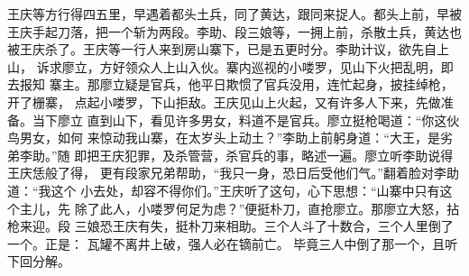 王庆等方行得四五里，早遇着都头土兵，同了黄达，跟同来捉人。都头上前，早被
王庆手起刀落，把一个斩为两段。李助、段三娘等，一拥上前，杀散土兵，黄达也
被王庆杀了。王庆等一行人来到房山寨下，已是五更时分。李助计议，欲先自上山，
诉求廖立，方好领众人上山入伙。寨内巡视的小喽罗，见山下火把乱明，即去报知
寨主。那廖立疑是官兵，他平日欺惯了官兵没用，连忙起身，披挂绰枪，开了栅寨，
点起小喽罗，下山拒敌。王庆见山上火起，又有许多人下来，先做准备。当下廖立
直到山下，看见许多男女，料道不是官兵。廖立挺枪喝道：“你这伙鸟男女，如何
来惊动我山寨，在太岁头上动土？”李助上前躬身道：“大王，是劣弟李助。”随
即把王庆犯罪，及杀管营，杀官兵的事，略述一遍。廖立听李助说得王庆恁般了得，
更有段家兄弟帮助，“我只一身，恐日后受他们气。”翻着脸对李助道：“我这个
小去处，却容不得你们。”王庆听了这句，心下思想：“山寨中只有这个主儿，先
除了此人，小喽罗何足为虑？”便挺朴刀，直抢廖立。那廖立大怒，拈枪来迎。段
三娘恐王庆有失，挺朴刀来相助。三个人斗了十数合，三个人里倒了一个。正是：
瓦罐不离井上破，强人必在镝前亡。
毕竟三人中倒了那一个，且听下回分解。
